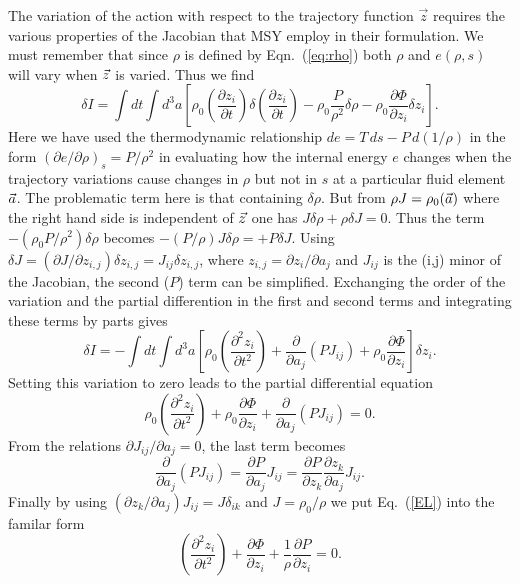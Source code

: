 The variation of the action with respect to the trajectory function
${\vec z}$ requires the various properties of the Jacobian that MSY
employ in their formulation.
    We must remember that since $\rho$ is defined by Eqn.~(\ref{eq:rho})
both $\rho$ and $e(\rho,s)$ will vary when ${\vec z}$ is varied.
    Thus we find
    \begin{equation}
    \delta I = \int\!\! dt \int\!\! d^3a \left[ \rho_0
    \left(\frac{\partial z_i}{\partial t}\right)\delta
    \left(\frac{\partial z_i}{\partial t} \right) 
    - \rho_0 \frac{P}{\rho^2} \delta \rho
    - \rho_0 \frac{\partial \Phi}{\partial z_i} \delta {z_i} 
    \right].
    \end{equation}
    Here we have used the thermodynamic relationship $de = T\,ds -
P\,d(1/\rho)$ in the form $(\partial e/\partial \rho)_s = P/\rho^2$
in evaluating how the internal energy $e$ changes when the trajectory
variations cause changes in $\rho$ but not in $s$ at a particular
fluid element ${\vec a}$.
    The problematic term here is that containing $\delta \rho$.
    But from $\rho J = \rho_0({\vec a})$ where the right hand side is
independent of ${\vec z}$ one has $J \delta \rho + \rho \delta J = 0$.
    Thus the term $-(\rho_0 {P}/{\rho^2}) \delta \rho$  becomes 
$-(P/\rho) J \delta \rho = + P \delta J$.
    Using $\delta J = ({\partial J}/{\partial z_{i,j}}) \delta
z_{i,j} = J_{ij} \delta z_{i,j}$, where $z_{i,j} = {\partial
z_i}/{\partial a_j}$ and $J_{ij}$ is the (i,j) minor of the Jacobian,
the second ($P$) term can be simplified.  
    Exchanging the order of the variation and the partial
differention in the first and second terms and integrating these terms
by parts gives
    \begin{equation}
    \delta I = -\int\!\! dt \int\!\! d^3a \left[ \rho_0
    \left(\frac{\partial^2 z_i}{\partial t^2}\right) 
    + \frac{\partial}{\partial
    a_j}\left(P J_{ij}\right) 
    + \rho_0 \frac{\partial \Phi}{\partial z_i} 
    \right] \delta z_i.
    \end{equation}
    Setting this variation to zero leads to the partial differential
equation
    \begin{equation}\label{EL}
    \rho_0 \left(\frac{\partial^2 z_i}{\partial t^2}\right) + \rho_0
    \frac{\partial \Phi}{\partial z_i} + \frac{\partial}{\partial
    a_j}\left(P J_{ij}\right) = 0.
    \end{equation}
    From the relations ${\partial J_{ij}}/{\partial a_j} = 0$,
the last term becomes
    \begin{equation}
    \frac{\partial}{\partial a_j}\left(P  J_{ij} \right) =
    \frac{\partial P}{\partial a_j} J_{ij} = \frac{\partial P}{\partial
    z_k}\frac{\partial z_k}{\partial a_j} J_{ij}.
    \end{equation}
    Finally by using $({\partial z_k}/{\partial a_j}) J_{ij} = J
\delta_{ik}$ and $J = \rho_0 / \rho$ we put Eq.~(\ref{EL}) into the
familar form
    \begin{equation}\label{eq:Euler}
    \left(\frac{\partial^2 z_i}{\partial t^2}\right) + \frac{\partial
    \Phi}{\partial z_i} + \frac{1}{\rho} \frac{\partial P}{\partial z_i} =
    0.
    \end{equation}




